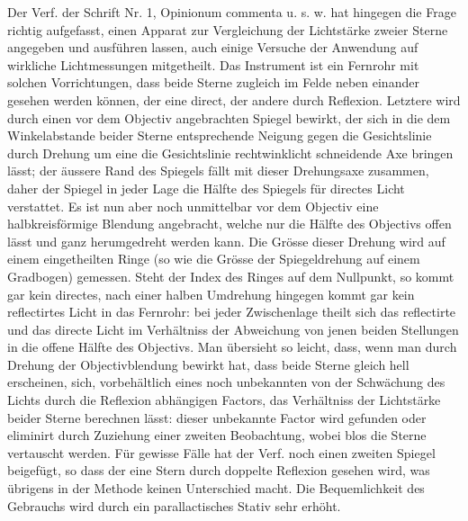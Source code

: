 Der Verf. der Schrift Nr. 1, Opinionum commenta u. s. w. hat hingegen die Frage richtig aufgefasst, einen Apparat zur Vergleichung der Lichtstärke zweier Sterne angegeben und ausführen lassen, auch einige Versuche der Anwendung auf wirkliche Lichtmessungen mitgetheilt. Das Instrument ist ein Fernrohr mit solchen Vorrichtungen, dass beide Sterne zugleich im Felde neben einander gesehen werden können, der eine direct, der andere durch Reflexion. Letztere wird durch einen vor dem Objectiv angebrachten Spiegel bewirkt, der sich in die dem Winkelabstande beider Sterne entsprechende Neigung gegen die Gesichtslinie durch Drehung um eine die Gesichtslinie rechtwinklicht schneidende Axe bringen lässt; der äussere Rand des Spiegels fällt mit dieser Drehungsaxe zusammen, daher der Spiegel in jeder Lage die Hälfte des Spiegels für directes Licht verstattet. Es ist nun aber noch unmittelbar vor dem Objectiv eine halbkreisförmige Blendung angebracht, welche nur die Hälfte des Objectivs offen lässt und ganz herumgedreht werden kann. Die Grösse dieser Drehung wird auf einem eingetheilten Ringe (so wie die Grösse der Spiegeldrehung auf einem Gradbogen) gemessen. Steht der Index des Ringes auf dem Nullpunkt, so kommt gar kein directes, nach einer halben Umdrehung hingegen kommt gar kein reflectirtes Licht in das Fernrohr: bei jeder Zwischenlage theilt sich das reflectirte und das directe Licht im Verhältniss der Abweichung von jenen beiden Stellungen in die offene Hälfte des Objectivs. Man übersieht so leicht, dass, wenn man durch Drehung der Objectivblendung bewirkt hat, dass beide Sterne gleich hell erscheinen, sich, vorbehältlich eines noch unbekannten von der Schwächung des Lichts durch die Reflexion abhängigen Factors, das Verhältniss der Lichtstärke beider Sterne berechnen lässt: dieser unbekannte Factor wird gefunden oder eliminirt durch Zuziehung einer zweiten Beobachtung, wobei blos die Sterne vertauscht werden. Für gewisse Fälle hat der Verf. noch einen zweiten Spiegel beigefügt, so dass der eine Stern durch doppelte Reflexion gesehen wird, was übrigens in der Methode keinen Unterschied macht. Die Bequemlichkeit des Gebrauchs wird durch ein parallactisches Stativ sehr erhöht.

